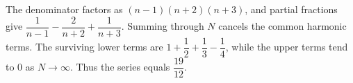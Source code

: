 The denominator factors as $(n-1)(n+2)(n+3)$, and partial fractions give $\dfrac{1}{n-1}-\dfrac{2}{n+2}+\dfrac{1}{n+3}$. Summing through $N$ cancels the common harmonic terms. The surviving lower terms are $1+\dfrac{1}{2}+\dfrac{1}{3}-\dfrac{1}{4}$, while the upper terms tend to 0 as $N\to\infty$. Thus the series equals $\boxed{\dfrac{19}{12}}$.
